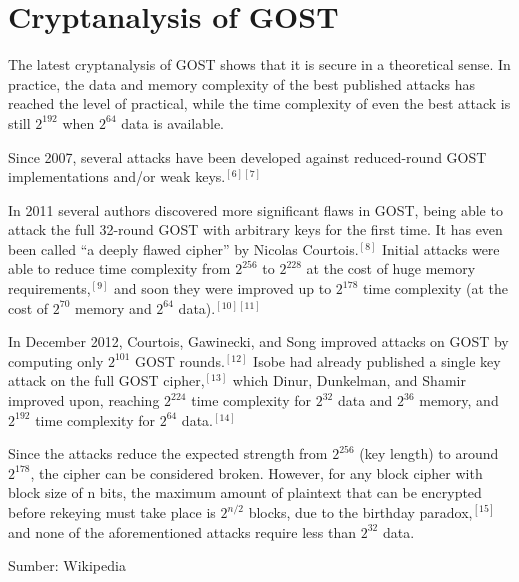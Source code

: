 \documentclass{article}
\begin{document}

\section*{Cryptanalysis of GOST}

The latest cryptanalysis of GOST shows that it is secure in a theoretical sense. In practice, the data and memory complexity of the best published attacks has reached the level of practical, while the time complexity of even the best attack is still $2^{192}$ when $2^{64}$ data is available.

Since 2007, several attacks have been developed against reduced-round GOST implementations and/or weak keys.$^{[6][7]}$

In 2011 several authors discovered more significant flaws in GOST, being able to attack the full 32-round GOST with arbitrary keys for the first time. It has even been called ``a deeply flawed cipher'' by Nicolas Courtois.$^{[8]}$ Initial attacks were able to reduce time complexity from $2^{256}$ to $2^{228}$ at the cost of huge memory requirements,$^{[9]}$ and soon they were improved up to $2^{178}$ time complexity (at the cost of $2^{70}$ memory and $2^{64}$ data).$^{[10][11]}$

In December 2012, Courtois, Gawinecki, and Song improved attacks on GOST by computing only $2^{101}$ GOST rounds.$^{[12]}$ Isobe had already published a single key attack on the full GOST cipher,$^{[13]}$ which Dinur, Dunkelman, and Shamir improved upon, reaching $2^{224}$ time complexity for $2^{32}$ data and $2^{36}$ memory, and $2^{192}$ time complexity for $2^{64}$ data.$^{[14]}$

Since the attacks reduce the expected strength from $2^{256}$ (key length) to around $2^{178}$, the cipher can be considered broken. However, for any block cipher with block size of n bits, the maximum amount of plaintext that can be encrypted before rekeying must take place is $2^{n/2}$ blocks, due to the birthday paradox,$^{[15]}$ and none of the aforementioned attacks require less than $2^{32}$ data.

\begin{flushright}
Sumber: Wikipedia
\end{flushright}
\end{document}
